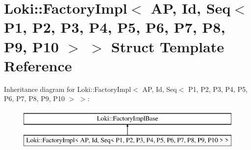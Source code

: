 \hypertarget{structLoki_1_1FactoryImpl_3_01AP_00_01Id_00_01Seq_3_01P1_00_01P2_00_01P3_00_01P4_00_01P5_00_01P623d57a0b18074641c8bca6ad36c44171}{}\section{Loki\+:\+:Factory\+Impl$<$ A\+P, Id, Seq$<$ P1, P2, P3, P4, P5, P6, P7, P8, P9, P10 $>$ $>$ Struct Template Reference}
\label{structLoki_1_1FactoryImpl_3_01AP_00_01Id_00_01Seq_3_01P1_00_01P2_00_01P3_00_01P4_00_01P5_00_01P623d57a0b18074641c8bca6ad36c44171}
Inheritance diagram for Loki\+:\+:Factory\+Impl$<$ A\+P, Id, Seq$<$ P1, P2, P3, P4, P5, P6, P7, P8, P9, P10 $>$ $>$\+:\begin{figure}[H]
\begin{center}
\leavevmode
\includegraphics[height=2.000000cm]{structLoki_1_1FactoryImpl_3_01AP_00_01Id_00_01Seq_3_01P1_00_01P2_00_01P3_00_01P4_00_01P5_00_01P623d57a0b18074641c8bca6ad36c44171}
\end{center}
\end{figure}
